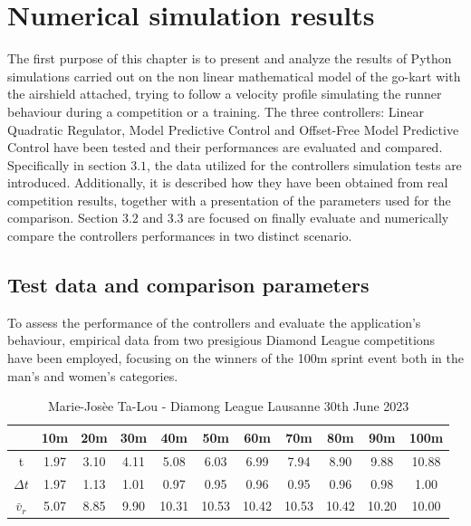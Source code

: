 \documentclass[a4paper,12pt,oneside]{book}
\begin{document}
\chapter{Numerical simulation results}
\label{chapter:Simulations_results}
The first purpose of this chapter is to present and analyze the results of Python simulations carried out on the non linear mathematical model of the go-kart with the airshield attached,  trying to follow a velocity profile simulating the runner behaviour during a competition or a training.
The three controllers: Linear Quadratic Regulator, Model Predictive Control and Offset-Free Model Predictive Control have been tested and their performances are evaluated and compared.
Specifically in section $3.1$, the data utilized for the controllers simulation tests are introduced.
Additionally, it is described how they have been obtained from real competition results, together with a presentation of the parameters used for the comparison.
Section $3.2$ and $3.3$ are focused on finally evaluate and numerically compare the controllers performances in two distinct scenario.

\section{Test data and comparison parameters}
To assess the performance of the controllers and evaluate the application's behaviour, empirical data from two presigious Diamond League competitions \cite{diamondleague}  have been employed, focusing on the winners of the 100m sprint event both in the man's and women's categories. 

\begin{table}[h!]
	\centering
	\begin{adjustbox}{max width=\textwidth}
	\begin{tabular}{c|c|c|c|c|c|c|c|c|c|c}
           & 10m & 20m & 30m & 40m & 50m & 60m & 70m & 80m & 90m &100m \\
	\hline
	\hline
	t & 1.97 & 3.10 & 4.11 & 5.08 & 6.03 & 6.99 & 7.94 & 8.90 & 9.88 & 10.88  \\	
	$\Delta t$ & 1.97 & 1.13 & 1.01 & 0.97 & 0.95 & 0.96 & 0.95 & 0.96 & 0.98 & 1.00 \\
	$\bar{v}_r$ & 5.07 & 8.85 & 9.90 & 10.31 & 10.53 & 10.42 & 10.53 & 10.42 & 10.20 & 10.00 \\
	\hline
	\end{tabular}
	\end{adjustbox}
\caption{Marie-Josèe Ta-Lou - Diamong League Lausanne 30th June 2023}
\label{tab:Women}
\end{table}
\end{document}

